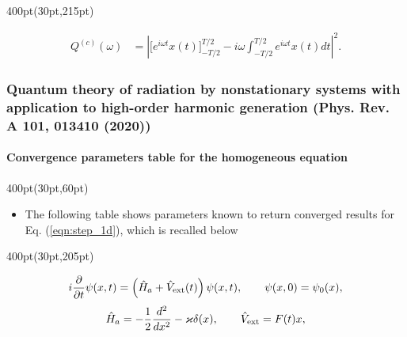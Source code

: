 \begin{frame}
\begin{textblock*}{400pt}(30pt,215pt)
\scriptsize

\begin{align}
    Q^{(c)}(\omega) & = \left|\Bigg[ e^{i\omega t} x(t)\Bigg]_{-T/2}^{T/2}
               -i\omega \int_{-T/2}^{T/2} e^{i\omega t}x(t)dt\right|^2.
                \nonumber
\end{align}

\end{textblock*}

\end{frame}




\begin{frame}
\frametitle{Quantum theory of radiation by nonstationary systems 
	with application to high-order harmonic generation
        (Phys. Rev. A 101, 013410 (2020))}
	\framesubtitle{Convergence parameters table for 
             the homogeneous equation}
\small

\begin{textblock*}{400pt}(30pt,60pt)
\footnotesize
\begin{itemize}
\item The following table shows parameters known to return converged results 
for Eq. (\ref{eqn:step_1d}), which is recalled below
\end{itemize}

\end{textblock*}

\vspace{20pt}

{
\tiny 


}


\begin{textblock*}{400pt}(30pt,205pt)
\scriptsize

\begin{equation}
	i\frac{\partial}{\partial t}\psi(x,t)
	   = \left( \hat{H}_a + \hat{V}_{\rm ext}(t)\right) 
	   \psi(x,t),   \hspace{20pt}\psi(x,0)=\psi_0(x), \nonumber
\end{equation}
\begin{equation}
  \hat{H}_a = -\frac{1}{2}\frac{d^2}{dx^2} - \varkappa\delta(x), \hspace{20pt}
  \hat{V}_{\rm ext} = F(t)x,   \nonumber
\end{equation}


\end{textblock*}
\end{frame}
